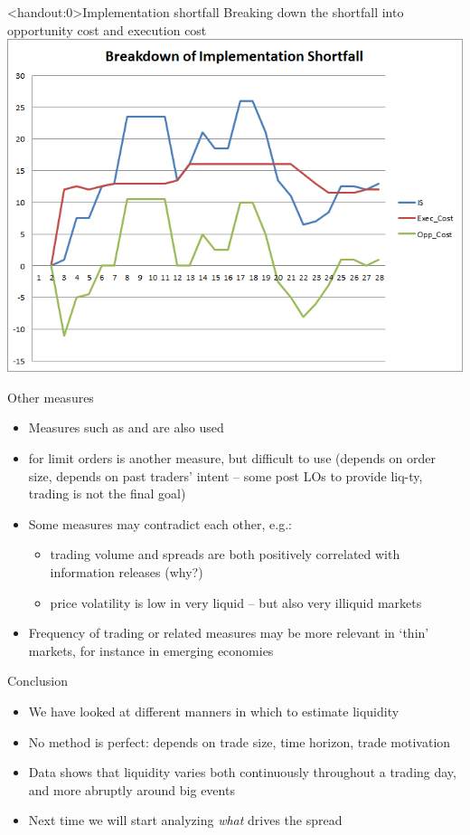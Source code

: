 \documentclass[english,10pt
,aspectratio=169
]{beamer}
\begin{document}
\begin{frame}<handout:0>{Implementation shortfall}
	Breaking down the shortfall into opportunity cost and execution cost
	\center
	\includegraphics[scale=0.39]{pics/L2_is2}
\end{frame}


\begin{frame}{Other measures}
\begin{itemize}
	\item Measures such as  and  are also used
	\item {} for limit orders is another measure, but difficult to use (depends on order size, depends on past traders' intent -- some post LOs to provide liq-ty, trading is not the final goal)
	\\[4ex]
	\item Some measures may contradict each other, e.g.:
	\begin{itemize}
		\item trading volume and spreads are both positively correlated with information releases (why?)
		\item price volatility is low in very liquid -- but also very illiquid markets
	\end{itemize}
	\item Frequency of trading or related measures may be more relevant in `thin' markets, for instance in emerging economies
\end{itemize}
\end{frame}


\begin{frame}{Conclusion}
	\begin{itemize}
		\item We have looked at different manners in which to estimate liquidity
		\item No method is perfect: depends on trade size, time horizon, trade motivation
		\item Data shows that liquidity varies both continuously throughout a trading day, and more abruptly around big events
		\item Next time we will start analyzing \textit{what} drives the spread
	\end{itemize}
\end{frame}
\end{document}
